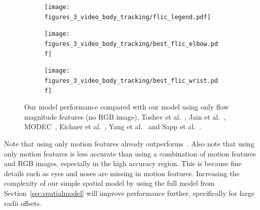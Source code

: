 \begin{figure}[ht]
        \centering
	\begin{subfigure}{\textwidth}
	\texttt{[image: figures\_3\_video\_body\_tracking/flic\_legend.pdf]}
	\end{subfigure}
	\hfill
        
        \begin{subfigure}{0.45\textwidth}
                \centering
                \texttt{[image: figures\_3\_video\_body\_tracking/best\_flic\_elbow.pdf]}
                \caption{\footnotesize }
                \label{fig:flic_elbow_video}
        \end{subfigure}
        \begin{subfigure}{0.45\textwidth}
                \centering
                \texttt{[image: figures\_3\_video\_body\_tracking/best\_flic\_wrist.pdf]}
                \caption{\footnotesize }
                \label{fig:flic_wrist_video}
        \end{subfigure}

        \caption{Our model performance compared with our model using only flow magnitude features (no RGB image), Toshev et al.~\cite{deeppose}, Jain et al.~\cite{jainiclr2014},  MODEC~\cite{modec}, Eichner et al.~\cite{Eichner:2009:BAM}, Yang et al.~\cite{yang11cvpr} and Sapp et al.~\cite{sapp11eccv}.}
        \label{fig:flic_results_video}
\end{figure}

Note that using only motion features already outperforms~\cite{Eichner:2009:BAM, yang11cvpr, sapp11eccv}. Also note that using only motion features is less accurate than using a combination of motion features and RGB images, especially in the high accuracy region. This is because fine details such as eyes and noses are missing in motion features. Increasing the complexity of our simple spatial model by using the full model from Section~\ref{sec:spatialmodel} will improve performance further, specifically for large radii offsets.